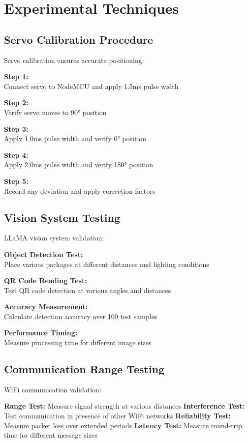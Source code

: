 \section{Experimental Techniques}

\subsection{Servo Calibration Procedure}
Servo calibration ensures accurate positioning:

\textbf{Step 1:}
\\Connect servo to NodeMCU and apply 1.5ms pulse width

\textbf{Step 2:}
\\Verify servo moves to 90° position

\textbf{Step 3:}
\\Apply 1.0ms pulse width and verify 0° position

\textbf{Step 4:}
\\Apply 2.0ms pulse width and verify 180° position

\textbf{Step 5:}
\\Record any deviation and apply correction factors

\subsection{Vision System Testing}
LLaMA vision system validation:

\textbf{Object Detection Test:}
\\Place various packages at different distances and lighting conditions

\textbf{QR Code Reading Test:}
\\Test QR code detection at various angles and distances

\textbf{Accuracy Measurement:}
\\Calculate detection accuracy over 100 test samples

\textbf{Performance Timing:}
\\Measure processing time for different image sizes

\subsection{Communication Range Testing}
WiFi communication validation:

\textbf{Range Test:} Measure signal strength at various distances
\textbf{Interference Test:} Test communication in presence of other WiFi networks
\textbf{Reliability Test:} Measure packet loss over extended periods
\textbf{Latency Test:} Measure round-trip time for different message sizes

